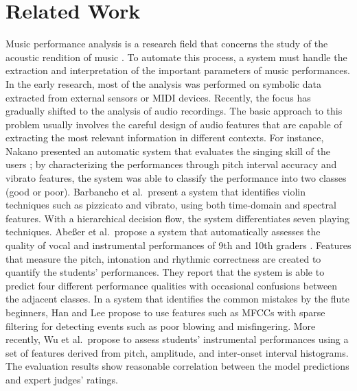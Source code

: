 \documentclass[conference]{IEEEtran}
\begin{document}
\section{Related Work}\label{sec:relatedwork}
Music performance analysis is a research field that concerns the study of the acoustic rendition of music \cite{lerch_software-based_2009}. To automate this process, a system must handle the extraction and interpretation of the important parameters of music performances. In the early research, most of the analysis was performed on symbolic data extracted from external sensors or MIDI devices. Recently, the focus has gradually shifted to the analysis of audio recordings. The basic approach to this problem usually involves the careful design of audio features that are capable of extracting the most relevant information in different contexts. For instance, Nakano presented an automatic system that evaluates the singing skill of the users \cite{Nakano2006a}; by characterizing the performances through pitch interval accuracy and vibrato features, the system was able to classify the performance into two classes (good or poor). 
Barbancho et al.\  present a system that identifies violin techniques such as pizzicato and vibrato, using both time-domain and spectral features\cite{Barbancho2009}. With a hierarchical decision flow, the system differentiates seven playing techniques. 
Abe{\ss}er et al.\ propose a system that automatically assesses the quality of vocal and instrumental performances of 9th and 10th graders \cite{Abeßer2013}. Features that measure the pitch, intonation and rhythmic correctness are created to quantify the students' performances. They report that the system is able to predict four different performance qualities with occasional confusions between the adjacent classes. In a system that identifies the common mistakes by the flute beginners, Han and Lee propose to use features such as MFCCs with sparse filtering for detecting events such as poor blowing and misfingering\cite{Han2014}. %
More recently, Wu et al.\  propose to assess students' instrumental performances using a set of features derived from pitch, amplitude, and inter-onset interval histograms\cite{Wu2016, Vidwans2017}. The evaluation results show reasonable correlation between the model predictions and expert judges' ratings. 
\end{document}
